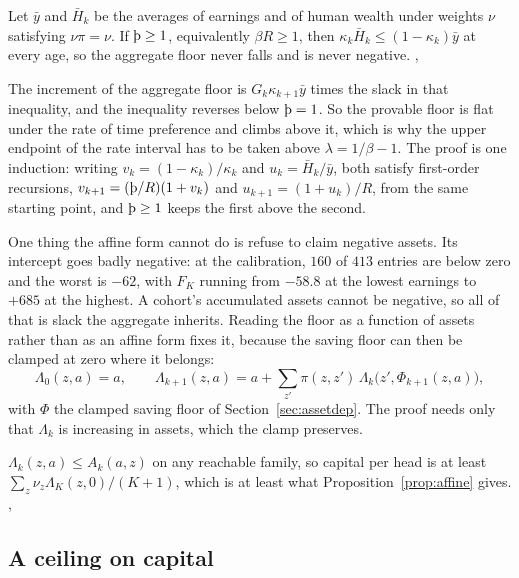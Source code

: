 \begin{theorem}\label{thm:patient}
Let $\bar y$ and $\bar H_k$ be the averages of earnings and of human wealth under weights $\nu$
satisfying $\nu\pi=\nu$. If $\Thorn\ge1$, equivalently $\beta R\ge1$, then
$\kappa_k\bar H_k\le(1-\kappa_k)\bar y$ at every age, so the aggregate floor never falls and is
never negative.
,
\end{theorem}

The increment of the aggregate floor is $G_k\kappa_{k+1}\bar y$ times the slack in that
inequality, and the inequality reverses below $\Thorn=1$. So the provable floor is flat under the
rate of time preference and climbs above it, which is why the upper endpoint of the rate interval
has to be taken above $\lambda=1/\beta-1$. The proof is one induction: writing
$v_k=(1-\kappa_k)/\kappa_k$ and $u_k=\bar H_k/\bar y$, both satisfy first-order recursions,
$v_{k+1}=(\Thorn/R)(1+v_k)$ and $u_{k+1}=(1+u_k)/R$, from the same starting point, and
$\Thorn\ge1$ keeps the first above the second.

One thing the affine form cannot do is refuse to claim negative assets. Its intercept goes badly
negative: at the calibration, $160$ of $413$ entries are below zero and the worst is $-62$, with
$F_K$ running from $-58.8$ at the lowest earnings to $+685$ at the highest. A cohort's accumulated
assets cannot be negative, so all of that is slack the aggregate inherits. Reading the floor as a
function of assets rather than as an affine form fixes it, because the saving floor can then be
clamped at zero where it belongs:
\[
  \Lambda_0(z,a)=a,\qquad
  \Lambda_{k+1}(z,a)=a+\textstyle\sum_{z'}\pi(z,z')\,\Lambda_k\bigl(z',\Phi_{k+1}(z,a)\bigr),
\]
with $\Phi$ the clamped saving floor of Section~\ref{sec:assetdep}. The proof needs only that
$\Lambda_k$ is increasing in assets, which the clamp preserves.

\begin{proposition}\label{prop:clampfloor}
$\Lambda_k(z,a)\le A_k(a,z)$ on any reachable family, so capital per head is at least
$\sum_z\nu_z\Lambda_K(z,0)/(K+1)$, which is at least what Proposition~\ref{prop:affine} gives.
,
\end{proposition}

\subsection{A ceiling on capital}\label{sec:affceil}

